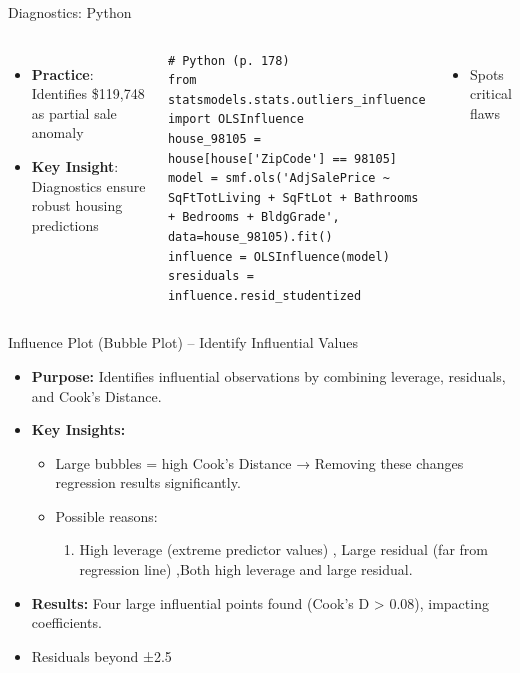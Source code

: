 \documentclass{beamer}
\begin{document}
	\begin{frame}[fragile]{Diagnostics: Python}
		\lstset{language=Python}
		\begin{columns}
			\begin{itemize}
				\item \textbf{Practice}: Identifies \$119,748 as partial sale anomaly
				\item \textbf{Key Insight}: Diagnostics ensure robust housing predictions
			\end{itemize}
			\begin{lstlisting}
# Python (p. 178)
from statsmodels.stats.outliers_influence import OLSInfluence
house_98105 = house[house['ZipCode'] == 98105]
model = smf.ols('AdjSalePrice ~ SqFtTotLiving + SqFtLot + Bathrooms + Bedrooms + BldgGrade', data=house_98105).fit()
influence = OLSInfluence(model)
sresiduals = influence.resid_studentized
			\end{lstlisting}
			\begin{itemize}
				\item Spots critical flaws
			\end{itemize}
		\end{columns}
	\end{frame}
	
	\begin{frame}[fragile]{Influence Plot (Bubble Plot) – Identify Influential Values}
		\begin{itemize}
			\item \textbf{Purpose:} Identifies influential observations by combining leverage, residuals, and Cook’s Distance.
			\item \textbf{Key Insights:}
			\begin{itemize}
				\item Large bubbles = high Cook’s Distance → Removing these changes regression results significantly.
				\item Possible reasons:
				\begin{enumerate}
					\item High leverage (extreme predictor values) , Large residual (far from regression line) ,Both high leverage and large residual.
				\end{enumerate}
			\end{itemize}
			\item \textbf{Results:} Four large influential points found (Cook’s D > 0.08), impacting coefficients.
			\item Residuals beyond ±2.5
		\end{itemize}
		

	\end{frame}
	
\end{document}
